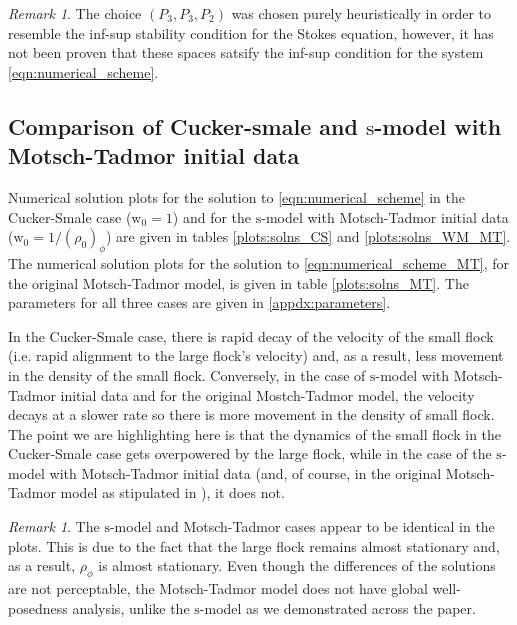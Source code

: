 \documentclass[11pt,letterpaper]{amsart}
\theoremstyle{plain}
\theoremstyle{definition}
\theoremstyle{remark}
\newtheorem{remark}[THEOREM]{Remark}
\def \st {\mathrm{s}}
\def \wt {\mathrm{w}}
\begin{document}
    \begin{remark}
        The choice $(P_3, P_3, P_2)$ was chosen purely heuristically in order to resemble the inf-sup stability condition for the Stokes equation,
        however, it has not been proven that these spaces satsify the inf-sup condition for the system \eqref{eqn:numerical_scheme}.
    \end{remark}

    \subsection{Comparison of Cucker-smale and $\st$-model with Motsch-Tadmor initial data}
    \label{appdx:comparison_CS_WM}
    Numerical solution plots for the solution to 
    \eqref{eqn:numerical_scheme} in the Cucker-Smale case ($\wt_0 = 1$) and for the $\st$-model with Motsch-Tadmor initial data ($\wt_0 = 1/(\rho_0)_{\phi}$) 
    are given in tables \ref{plots:solns_CS} and \ref{plots:solns_WM_MT}.  
    The numerical solution plots for the solution to \eqref{eqn:numerical_scheme_MT}, for the original Motsch-Tadmor model, is given in table \ref{plots:solns_MT}.
    The parameters for all three cases are given in \ref{appdx:parameters}.

    In the Cucker-Smale case, there is rapid decay of the velocity of the small flock (i.e. rapid alignment to the large flock's velocity) and, 
    as a result, less movement in the density of the small flock.  Conversely, in the case of $\st$-model with Motsch-Tadmor initial data and for the 
    original Mostch-Tadmor model, the velocity decays at a slower rate so there is more movement in the density of small flock. 
    The point we are highlighting here is that the dynamics of the small flock in the Cucker-Smale case gets overpowered 
    by the large flock, while in the case of the $\st$-model with Motsch-Tadmor initial data (and, of course, in the original Motsch-Tadmor model as stipulated in \cite{MT2011}), it does not. 

    \begin{remark}
        The $\st$-model and Motsch-Tadmor cases appear to be identical in the plots.  This is due to the fact that 
        the large flock remains almost stationary and, as a result, $\rho_{\phi}$ is almost stationary.  
        Even though the differences of the solutions are not perceptable, the Motsch-Tadmor model
        does not have global well-posedness analysis, unlike the $\st$-model as we demonstrated across  the paper.
    \end{remark}
\end{document}
